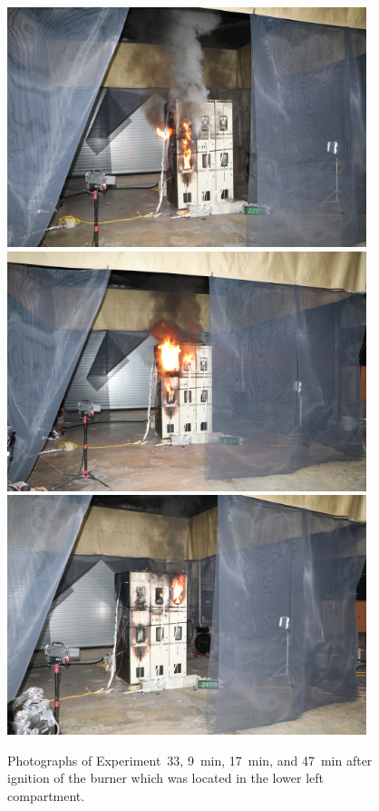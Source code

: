 \documentclass[12pt]{article}
\begin{document}
\begin{figure}[p]
\centering
\includegraphics[height=2.75in]{../FIGURES/Test_33_9_min} \\
\includegraphics[height=2.75in]{../FIGURES/Test_33_17_min} \\
\includegraphics[height=2.75in]{../FIGURES/Test_33_47_min}
\caption[Photographs of Experiment~33]{Photographs of Experiment~33, 9~min, 17~min, and 47~min after ignition of the burner which was located in the lower left compartment.}
\label{fig:Test_33_photos}
\end{figure}
\end{document}
